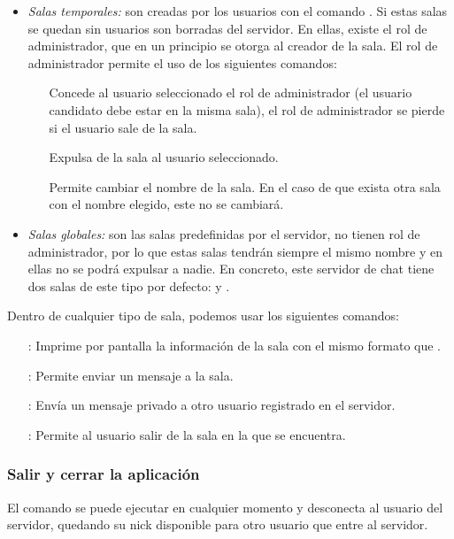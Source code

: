 \begin{itemize}
    \item \textit{Salas temporales:} son creadas por los usuarios con el comando . Si estas salas se quedan sin usuarios son borradas del servidor. En ellas, existe el rol de administrador, que en un principio se otorga al creador de la sala. El rol de administrador permite el uso de los siguientes comandos:
    
    \begin{itemize}[align=left]
        \item [\comm{promote <usuario>:}] Concede al usuario seleccionado el rol de administrador (el usuario candidato debe estar en la misma sala), el rol de administrador se pierde si el usuario sale de la sala.
        \item [\comm{kick <usuario>:}] Expulsa de la sala al usuario seleccionado.
        \item [\comm{rename <nuevo nombre>:}] Permite cambiar el nombre de la sala. En el caso de que exista otra sala con el nombre elegido, este no se cambiará.
    \end{itemize}
    
    \item \textit{Salas globales:} son las salas predefinidas por el servidor, no tienen rol de administrador, por lo que estas salas tendrán siempre el mismo nombre y en ellas no se podrá expulsar a nadie. En concreto, este servidor de chat tiene dos salas de este tipo por defecto:  y .
    
\end{itemize}
Dentro de cualquier tipo de sala, podemos usar los siguientes comandos:
\begin{itemize}[align=left]
    \item [\comm{info}:] Imprime por pantalla la información de la sala con el mismo formato que .
    \item [\comm{send <mensaje>}:] Permite enviar un mensaje a la sala. %
    \item [\comm{dm <usuario> {} <mensaje>}:] Envía un mensaje privado a otro usuario registrado en el servidor.
    \item [\comm{exit}:] Permite al usuario salir de la sala en la que se encuentra.
\end{itemize}

\subsubsection{Salir y cerrar la aplicación}
El comando  se puede ejecutar en cualquier momento y desconecta al usuario del servidor, quedando su nick disponible para otro usuario que entre al servidor.

